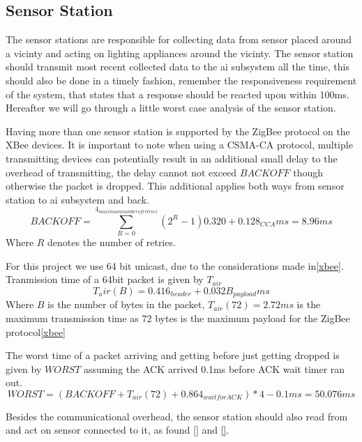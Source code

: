 \subsection{Sensor Station}\label{sub:sensorStation}

The sensor stations are responsible for collecting data from sensor placed around a vicinty and acting on lighting appliances around the vicinty. The sensor station should transmit most recent collected data to the ai subsystem all the time, this should also be done in a timely fashion, remember the responsiveness requirement of the system, that states that a response should be reacted upon within 100ms. Hereafter we will go through a little worst case analysis of the sensor station.

Having more than one sensor station is supported by the ZigBee protocol on the XBee devices. It is important to note when using a CSMA-CA protocol, multiple transmitting devices can potentially result in an additional small delay to the overhead of transmitting, the delay cannot not exceed $BACKOFF$ though otherwise the packet is dropped. This additional applies both ways from sensor station to ai subsystem and back.
\begin{equation*}
BACKOFF = \sum\limits_{R=0}^{4_{maximum number of retries}}(2^{R} - 1) 0.320 + 0.128_{CCA} ms = 8.96 ms
\end{equation*}
Where $R$ denotes the number of retries.

For this project we use 64 bit unicast, due to the considerations made in\cref{xbee}.
Tranmission time of a 64bit packet is given by $T_{air}$
\begin{equation*}
T_air(B) = 0.416_{header} + 0.032B_{payload} ms
\end{equation*}
Where $B$ is the number of bytes in the packet, $T_{air}(72) = 2.72 ms$ is the maximum transmission time as 72 bytes is the maximum payload for the ZigBee protocol\cref{xbee}

The worst time of a packet arriving and getting before just getting dropped is given by $WORST$ assuming the ACK arrived 0.1ms before ACK wait timer ran out.
\begin{equation*}
WORST = (BACKOFF + T_{air}(72) + 0.864_{wait for ACK})*4 - 0.1 ms = 50.076 ms
\end{equation*}

Besides the communicational overhead, the sensor station should also read from and act on sensor connected to it,  as found \cref{} and \cref{}.

